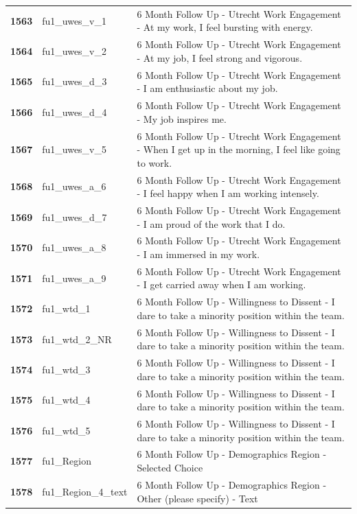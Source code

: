 \documentclass[
  letterpaper,
  DIV=11,
  numbers=noendperiod]{scrartcl}
\begin{document}
\begin{longtable}[t]{>{}cll}
\textbf{1563} & fu1\_uwes\_v\_1 & 6 Month Follow Up - Utrecht Work Engagement - At my work, I feel bursting with energy.\\
\textbf{1564} & fu1\_uwes\_v\_2 & 6 Month Follow Up - Utrecht Work Engagement - At my job, I feel strong and vigorous.\\
\textbf{1565} & fu1\_uwes\_d\_3 & 6 Month Follow Up - Utrecht Work Engagement - I am enthusiastic about my job.\\
\addlinespace
\textbf{1566} & fu1\_uwes\_d\_4 & 6 Month Follow Up - Utrecht Work Engagement - My job inspires me.\\
\textbf{1567} & fu1\_uwes\_v\_5 & 6 Month Follow Up - Utrecht Work Engagement - When I get up in the morning, I feel like going to work.\\
\textbf{1568} & fu1\_uwes\_a\_6 & 6 Month Follow Up - Utrecht Work Engagement - I feel happy when I am working intensely.\\
\textbf{1569} & fu1\_uwes\_d\_7 & 6 Month Follow Up - Utrecht Work Engagement - I am proud of the work that I do.\\
\textbf{1570} & fu1\_uwes\_a\_8 & 6 Month Follow Up - Utrecht Work Engagement - I am immersed in my work.\\
\addlinespace
\textbf{1571} & fu1\_uwes\_a\_9 & 6 Month Follow Up - Utrecht Work Engagement - I get carried away when I am working.\\
\textbf{1572} & fu1\_wtd\_1 & 6 Month Follow Up - Willingness to Dissent - I dare to take a minority position within the team.\\
\textbf{1573} & fu1\_wtd\_2\_NR & 6 Month Follow Up - Willingness to Dissent - I dare to take a minority position within the team.\\
\textbf{1574} & fu1\_wtd\_3 & 6 Month Follow Up - Willingness to Dissent - I dare to take a minority position within the team.\\
\textbf{1575} & fu1\_wtd\_4 & 6 Month Follow Up - Willingness to Dissent - I dare to take a minority position within the team.\\
\addlinespace
\textbf{1576} & fu1\_wtd\_5 & 6 Month Follow Up - Willingness to Dissent - I dare to take a minority position within the team.\\
\textbf{1577} & fu1\_Region & 6 Month Follow Up - Demographics Region - Selected Choice\\
\textbf{1578} & fu1\_Region\_4\_text & 6 Month Follow Up - Demographics Region - Other (please specify) - Text\\

\end{longtable}
\end{document}
